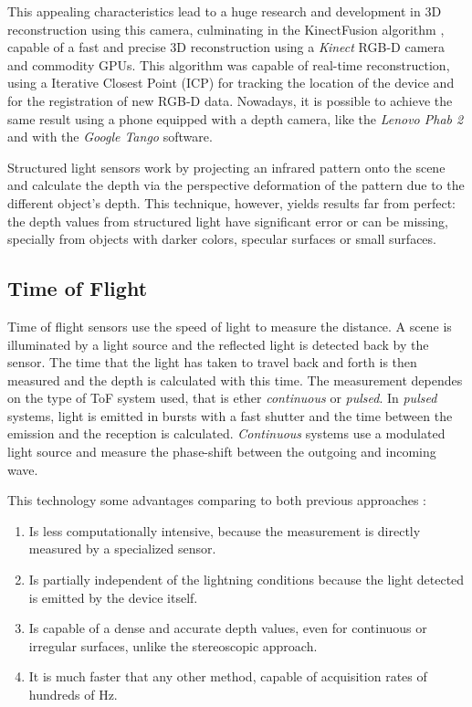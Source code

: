 This appealing characteristics lead to a huge research and development in 3D reconstruction using this camera, culminating in the KinectFusion algorithm \cite{kinectfusion2011}, capable of a fast and precise 3D reconstruction using a \textit{Kinect} RGB-D camera and commodity GPUs. This algorithm was capable of real-time reconstruction, using a Iterative Closest Point (ICP) for tracking the location of the device and for the registration of new RGB-D data. Nowadays, it is possible to achieve the same result using a phone equipped with a depth camera, like the \textit{Lenovo Phab 2} and with the \textit{Google Tango} software. 

Structured light sensors work by projecting an infrared pattern onto the scene and calculate the depth via the perspective deformation of the pattern due to the different object's depth. This technique, however, yields results far from perfect: the depth values from structured light have significant error or can be missing, specially from objects with darker colors, specular surfaces or small surfaces\cite{shen2013}. 

\subsection{Time of Flight}

Time of flight sensors use the speed of light to measure the distance. A scene is illuminated by a light source and the reflected light is detected back by the sensor. The time that the light has taken to travel back and forth is then measured and the depth is calculated with this time. The measurement dependes on the type of ToF system used, that is ether \textit{continuous} or \textit{pulsed}. In \textit{pulsed} systems, light is emitted in bursts with a fast shutter and the time between the emission and the reception is calculated. \textit{Continuous} systems use a modulated light source and measure the phase-shift between the outgoing and incoming wave.

This technology some advantages comparing to both previous approaches \cite{zollhoefer2018}:

\begin{enumerate}
    \item Is less computationally intensive, because the measurement is directly measured by a specialized sensor.
    \item Is partially independent of the lightning conditions because the light detected is emitted by the device itself.
    \item Is capable of a dense and accurate depth values, even for continuous or irregular surfaces, unlike the stereoscopic approach.
    \item It is much faster that any other method, capable of acquisition rates of hundreds of \si{\hertz}.
\end{enumerate}

